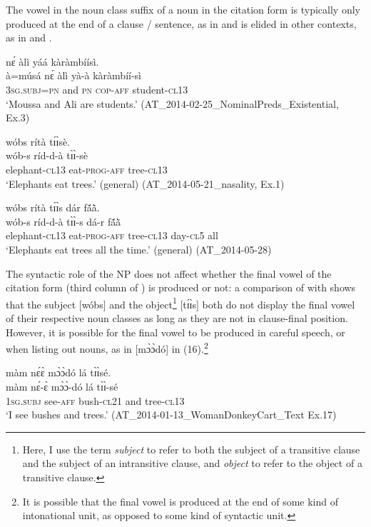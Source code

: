 \documentclass[output=paper]{langsci/langscibook}
\begin{document}
The vowel in the noun class suffix of a noun in the citation form is typically only produced at the end of a clause / sentence, as in  and is elided in other contexts, as in  and .

\ea\label{ex:teo:13}
 n\'ɛ àlì yáá kàràmbíísì.\\
à=músá n\'ɛ àlì yà-à kàràmbíí-sì\\
\textsc{3sg.subj=pn} and \textsc{pn} \textsc{cop-aff} student-\textsc{cl13}\\
\glt ‘Moussa and Ali are students.’ (AT\_2014-02-25\_NominalPreds\_Existential, Ex.3)
\z

\ea\label{ex:teo:14}
\glll wóbs rítà t\'ɪ\`ɪsè.\\
 wób-s ríd-d-à t\`ɪ\`ɪ-sè\\
elephant-\textsc{cl13} eat-\textsc{prog-aff} tree-\textsc{cl13}\\
\glt ‘Elephants eat trees.’ (general) (AT\_2014-05-21\_nasality, Ex.1)
\z

\ea\label{ex:teo:15}
\glll wóbs rítà t\'ɪ\`ɪs dár f\'{ã}\`{ã}.\\
 wób-s ríd-d-à t\`ɪ\`ɪ-s dá-r f\'{ã}\`{ã}\\
elephant-\textsc{cl13} eat-\textsc{prog-aff} tree-\textsc{cl13} day-\textsc{cl5} all\\
\glt ‘Elephants eat trees all the time.’ (general) (AT\_2014-05-28)
\z

The syntactic role of the NP does not affect whether the final vowel of the citation form (third column of ) is produced or not: a comparison of  with  shows that the subject [wóbs] and the object\footnote{Here, I use the term \textit{subject} to refer to both the subject of a transitive clause and the subject of an intransitive clause, and \textit{object} to refer to the object of a transitive clause.} [t\'ɪ\`ɪs] both do not display the final vowel of their respective noun classes as long as they are not in clause-final position. However, it is possible for the final vowel to be produced in careful speech, or when listing out nouns, as in [m\`ɔ\`ɔdó] in (16).\footnote{It is possible that the final vowel is produced at the end of some kind of intonational unit, as opposed to some kind of syntactic unit.}

\ea\label{ex:teo:16}
\glll màm n\'ɛ\`ɛ m\`ɔ\`ɔdó lá t\`ɪ\`ɪsé.\\
 màm n\'ɛ-\`ɛ m\`ɔ\`ɔ-dó lá t\`ɪ\`ɪ-sé\\
1\textsc{sg.subj} see-\textsc{aff} bush-\textsc{cl21} and tree-\textsc{cl13}\\
\glt ‘I see bushes and trees.’ (AT\_2014-01-13\_WomanDonkeyCart\_Text Ex.17)
\z
\end{document}
